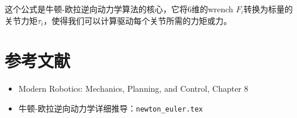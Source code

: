 \documentclass[12pt,a4paper]{article}
\begin{document}
这个公式是牛顿-欧拉逆向动力学算法的核心，它将6维的wrench $F_i$转换为标量的关节力矩$\tau_i$，使得我们可以计算驱动每个关节所需的力矩或力。

\section{参考文献}

\begin{itemize}
\item Modern Robotics: Mechanics, Planning, and Control, Chapter 8
\item 牛顿-欧拉逆向动力学详细推导：\texttt{newton\_euler.tex}
\end{itemize}
\end{document}
